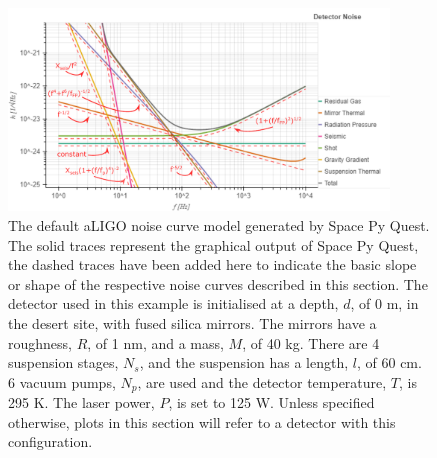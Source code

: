 \documentclass{article}
\begin{document}
\begin{figure}[htb]
\centering
         \includegraphics[width=0.9\textwidth, trim = {0 0 0 0.7cm}, clip]{SPQaLIGOscalings.pdf}
\caption{The default aLIGO noise curve model generated by Space Py
  Quest. The solid traces represent the graphical output of Space Py
  Quest, the dashed traces have been added here to indicate the basic slope or
  shape of the respective noise curves described in this section.
  The detector used in this example is initialised at a depth, $d$, of 0 m, in the
  desert site, with fused silica mirrors. The mirrors have a roughness, $R$,
  of 1 nm, and a mass, $M$, of 40 kg. There are 4 suspension stages,
  $N_s$, and the suspension has a length, $l$, of 60 cm. 6 vacuum
  pumps, $N_p$, are used and the detector temperature, $T$, is 295
  K. The laser power, $P$, is set to 125 W. Unless specified
  otherwise, plots in this section will refer to a detector with this
  configuration.}

\label{fig:aLIGO}
\end{figure}
\end{document}
